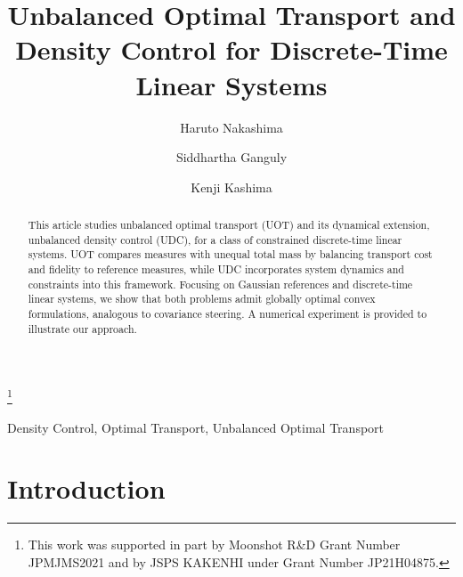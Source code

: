 \documentclass{ifacconf}
\makeatletter
\newcommand{\firstpageheadline}[1]{%
  \gdef\@firstpageheadline{#1}%
}
\gdef\@firstpageheadline{}
\makeatother
\begin{document}
\firstpageheadline{%
\parbox{0.95\textwidth}{\centering\large\bfseries
To appear in the Proceedings of MTNS 2026 (extended abstracts).\\
Submitted on February 15, 2026; accepted on April 20, 2026.
}%
}
\begin{frontmatter}

\title{Unbalanced Optimal Transport and Density Control for Discrete-Time Linear Systems} 


\thanks[footnoteinfo]{This work was supported in part by Moonshot R\&D Grant Number JPMJMS2021 and by JSPS KAKENHI under Grant Number JP21H04875.}

\author[First]{Haruto Nakashima} 
\author[Second]{Siddhartha Ganguly} 
\author[Third]{Kenji Kashima}

\address[First]{Kyoto University, 
   Kyoto, Sakyo-Ward Yoshida Honmach Japan (e-mail: nakashima.haruto.72v@st.kyoto-u.ac.jp).}
\address[Second]{Georgia Institute of Technology, 
   Daniel Guggenheim School of Aerospace Engineering, 270 Ferst Dr., Atlanta, USA (e-mail: sganguly41@gatech.edu).}
\address[Third]{Kyoto University, 
   Kyoto, Sakyo-Ward Yoshida Honmach Japan (e-mail: kk@kyoto-u.ac.jp).}

\begin{abstract}                
This article studies unbalanced optimal transport (UOT) and its dynamical extension, unbalanced density control (UDC), for a class of constrained discrete-time linear systems. UOT compares measures with unequal total mass by balancing transport cost and fidelity to reference measures, while UDC incorporates system dynamics and constraints into this framework. Focusing on Gaussian references and discrete-time linear systems, we show that both problems admit globally optimal convex formulations, analogous to covariance steering. A numerical experiment is provided to illustrate our approach.
\end{abstract}

\begin{keyword}
Density Control, Optimal Transport, Unbalanced Optimal Transport
\end{keyword}

\end{frontmatter}

\section{Introduction}\label{section:intro}
\end{document}
